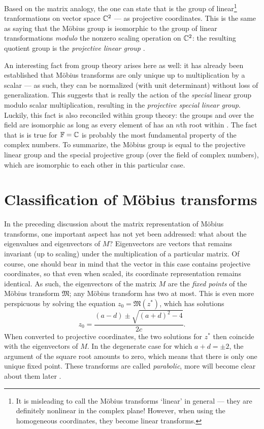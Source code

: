 Based on the matrix analogy, the one can state that \moebiusgroup is the group of linear\footnote{It is misleading to call the Möbius transforms `linear' in general --- they are definitely nonlinear in the complex plane! However, when using the homogeneous coordinates, they become linear transforms.} tranformations on vector space \(\mathbb{C}^2\) --- as projective coordinates. This is the same as saying that the Möbius group is isomorphic to the group of linear transformations \emph{modulo} the nonzero scaling operation on \(\mathbb{C}^2\): the resulting quotient group is the \emph{projective linear group} .

An interesting fact from group theory arises here as well: it has already been established that Möbius transforms are only unique up to multiplication by a scalar --- as such, they can be normalized (with unit determinant) without loss of generalization. This suggests that \moebiusgroup is really the action of the \emph{special} linear group modulo scalar multiplication, resulting in the \emph{projective special linear group}. Luckily, this fact is also reconciled within group theory: the groups  and  over the field \field are isomorphic as long as every element of \field has an \(n\)th root within \field. The fact that is is true for \(\mathbb{F} = \mathbb{C}\) is probably the most fundamental property of the complex numbers. To summarize, the Möbius group \moebiusgroup is equal to the projective linear group and the special projective group (over the field of complex numbers), which are isomorphic to each other in this particular case.

\section{Classification of Möbius transforms}
In the preceding discussion about the matrix representation of Möbius transforms, one important aspect has not yet been addressed: what about the eigenvalues and eigenvectors of \(M\)? Eigenvectors are vectors that remains invariant (up to scaling) under the multiplication of a particular matrix. Of course, one should bear in mind that the vector in this case contains projective coordinates, so that even when scaled, its coordinate representation remains identical. As such, the eigenvectors of the matrix \(M\) are the \emph{fixed points} of the Möbius transform \(\mathfrak{M}\); any Möbius transform has two at most. This is even more perspicuous by solving the equation \(z_0 = \mathfrak{M}(z^*)\), which has solutions
\[ z_0 = \frac{(a - d) \pm \sqrt{(a + d)^2 - 4}}{2c}.\]
When converted to projective coordinates, the two solutions for \(z^*\) then coincide with the eigenvectors of \(M\). In the degenerate case for which \(a + d = \pm2\), the argument of the square root amounts to zero, which means that there is only one unique fixed point. These transforms are called \emph{parabolic}, more will become clear about them later \cite{Needham1997}.

